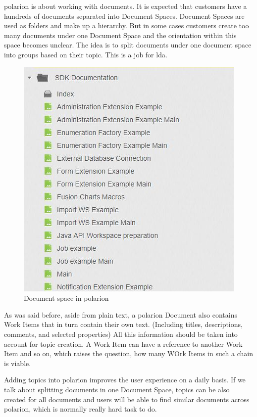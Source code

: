 \documentclass[thesis=M,english]{FITthesis}[2012/06/26]
\begin{document}
\acrshort{polarion} is about working with documents. It is expected that customers have a hundreds of documents separated into Document Spaces. Document Spaces are used as folders and make up a hierarchy. But in some cases customers create too many documents under one Document Space and the orientation within this space becomes unclear. The idea is to split documents under one document space into groups based on their topic. This is a job for \acrshort{lda}.

\begin{figure}[h!]\centering
	\includegraphics[width=1\textwidth]{pictures/polarion_document_space}
	\caption{Document space in \acrshort{polarion}}\label{fig:polarion_document_space}
\end{figure}

As was said before, aside from plain text, a \acrshort{polarion} Document also contains Work Items that in turn contain their own text. (Including titles, descriptions, comments, and selected properties) All this information should be taken into account for topic creation. A Work Item can have a reference to another Work Item and so on, which raises the question, how many WOrk Items in such a chain is viable.  

Adding topics into \acrshort{polarion} improves the user experience on a daily basis. If we talk about splitting documents in one Document Space, topics can be also created for all documents and users will be able to find similar documents across \acrshort{polarion}, which is normally really hard task to do.
\end{document}
